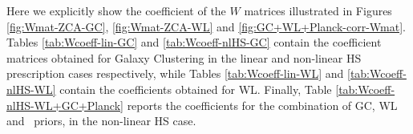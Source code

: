Here we explicitly show the coefficient of the $W$ matrices illustrated in Figures
\ref{fig:Wmat-ZCA-GC}, \ref{fig:Wmat-ZCA-WL}
and \ref{fig:GC+WL+Planck-corr-Wmat}.
Tables \ref{tab:Wcoeff-lin-GC} and \ref{tab:Wcoeff-nlHS-GC} contain the coefficient matrices obtained for 
Galaxy Clustering in the linear and non-linear HS prescription cases respectively, while 
Tables \ref{tab:Wcoeff-lin-WL} and \ref{tab:Wcoeff-nlHS-WL} contain the coefficients obtained for WL. 
Finally, Table \ref{tab:Wcoeff-nlHS-WL+GC+Planck} reports the coefficients for the combination of GC, 
WL and \planck\ priors, in the non-linear HS case.

